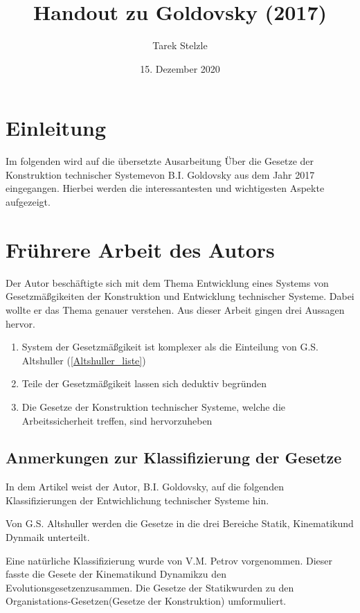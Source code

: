 \documentclass[DIV=22, 10pt, a4paper]{scrartcl}
\title{Handout zu Goldovsky (2017)}
\author{Tarek Stelzle}
\date{15. Dezember 2020}
\begin{document}
    \maketitle
    \tableofcontents
    \newpage

    \section{Einleitung}
    Im folgenden wird auf die übersetzte Ausarbeitung \glqq Über die Gesetze der Konstruktion technischer Systeme\grqq von B.I. Goldovsky aus dem Jahr 2017 eingegangen.
    Hierbei werden die interessantesten und wichtigesten Aspekte aufgezeigt.

    \section{Frührere Arbeit des Autors}
    Der Autor beschäftigte sich mit dem Thema \glqq Entwicklung eines Systems von Gesetzmäßgikeiten der Konstruktion und Entwicklung technischer Systeme\grqq.
    Dabei wollte er das Thema genauer verstehen. 
    Aus dieser Arbeit gingen drei Aussagen hervor. 

    \begin{enumerate}
        \item System der Gesetzmäßgikeit ist komplexer als die Einteilung von G.S. Altshuller (\ref{Altshuller_liste})
        \item Teile der Gesetzmäßgikeit lassen sich deduktiv begründen
        \item Die Gesetze der Konstruktion technischer Systeme, welche die Arbeitssicherheit treffen, sind hervorzuheben
    \end{enumerate}

    \subsection{Anmerkungen zur Klassifizierung der Gesetze}
    In dem Artikel weist der Autor, B.I. Goldovsky, auf die folgenden Klassifizierungen der Entwichlichung technischer Systeme hin.

    Von G.S. Altshuller \label{Altshuller_liste} werden die Gesetze in die drei Bereiche \glqq Statik\grqq, \glqq Kinematik\grqq und \glqq Dynmaik\grqq{} unterteilt.

    Eine natürliche Klassifizierung wurde von V.M. Petrov vorgenommen.
    Dieser fasste die Gesete der \glqq Kinematik\grqq und \glqq Dynamik\grqq zu den \glqq Evolutionsgesetzen\grqq zusammen. 
    Die Gesetze der \glqq Statik\grqq wurden zu den \glqq Organistations-Gesetzen\grqq (Gesetze der Konstruktion) umformuliert.
\end{document}
